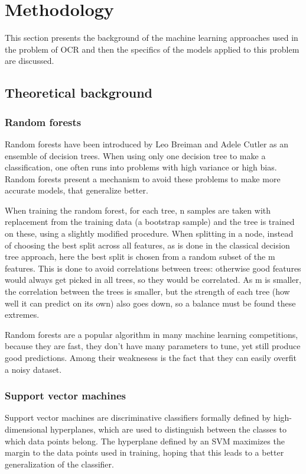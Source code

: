 \section{Methodology}
This section presents the background of the machine learning approaches used in the problem of OCR and then the specifics of the models applied to this problem are discussed. 

\subsection{Theoretical background}

\subsubsection{Random forests}

Random forests have been introduced by Leo Breiman and Adele Cutler\cite{breiman2001random} as an ensemble of decision trees. When using only one decision tree to make a classification, one often runs into problems with high variance or high bias. Random forests present a mechanism to avoid these problems to make more accurate models, that generalize better. 

When training the random forest, for each tree, n samples are taken with replacement from the training data (a bootstrap sample) and the tree is trained on these, using a slightly modified procedure. When splitting in a node, instead of choosing the best split across all features, as is done in the classical decision tree approach, here the best split is chosen from a random subset of the m features. This is done to avoid correlations between trees: otherwise good features would always get picked in all trees, so they would be correlated. As m is smaller, the correlation between the trees is smaller, but the strength of each tree (how well it can predict on its own) also goes down, so a balance must be found these extremes. 

Random forests are a popular algorithm in many machine learning competitions, because they are fast, they don't have many parameters to tune, yet still produce good predictions. Among their weaknesess is the fact that they can easily overfit a noisy dataset. 

\subsubsection{Support vector machines}

Support vector machines\cite{Cortes_1995} are discriminative classifiers formally defined by high-dimensional hyperplanes, which are used to distinguish between the classes to which data points belong. The hyperplane defined by an SVM maximizes the margin to the data points used in training, hoping that this leads to a better generalization of the classifier. 

